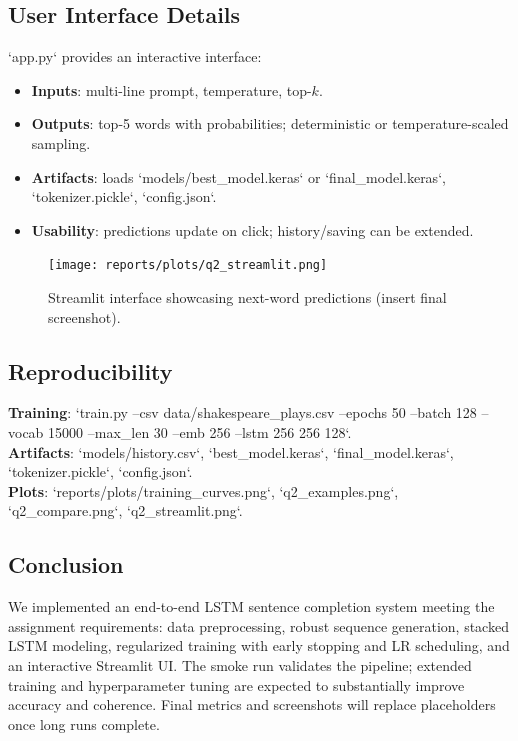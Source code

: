\documentclass[12pt,a4paper]{article}
\begin{document}
\subsection{User Interface Details}

`app.py` provides an interactive interface:
\begin{itemize}
  \item \textbf{Inputs}: multi-line prompt, temperature, top-$k$.
  \item \textbf{Outputs}: top-5 words with probabilities; deterministic or temperature-scaled sampling.
  \item \textbf{Artifacts}: loads `models/best_model.keras` or `final_model.keras`, `tokenizer.pickle`, `config.json`.
  \item \textbf{Usability}: predictions update on click; history/saving can be extended.
\end{itemize}

\begin{figure}[H]
\centering
\texttt{[image: reports/plots/q2\_streamlit.png]}
\caption{Streamlit interface showcasing next-word predictions (insert final screenshot).}
\end{figure}

\subsection{Reproducibility}

\textbf{Training}: `train.py --csv data/shakespeare_plays.csv --epochs 50 --batch 128 --vocab 15000 --max_len 30 --emb 256 --lstm 256 256 128`.\\
\textbf{Artifacts}: `models/history.csv`, `best_model.keras`, `final_model.keras`, `tokenizer.pickle`, `config.json`.\\
\textbf{Plots}: `reports/plots/training_curves.png`, `q2_examples.png`, `q2_compare.png`, `q2_streamlit.png`.

\subsection{Conclusion}

We implemented an end-to-end LSTM sentence completion system meeting the assignment requirements: data preprocessing, robust sequence generation, stacked LSTM modeling, regularized training with early stopping and LR scheduling, and an interactive Streamlit UI. The smoke run validates the pipeline; extended training and hyperparameter tuning are expected to substantially improve accuracy and coherence. Final metrics and screenshots will replace placeholders once long runs complete.
\end{document}
